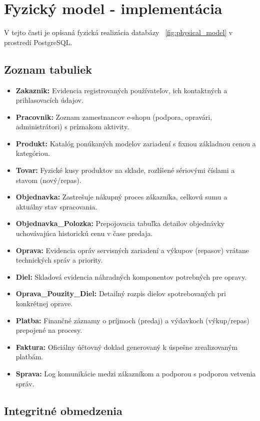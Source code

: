 \documentclass[11pt, a4paper]{article}
\begin{document}
\clearpage

\section{Fyzický model - implementácia}
\label{sec:model}
V tejto časti je opísaná fyzická realizácia databázy ~\ref{fig:physical_model} v prostredí PostgreSQL.

\subsection{Zoznam tabuliek}

\begin{itemize}
    \item \textbf{Zakaznik:} Evidencia registrovaných používateľov, ich kontaktných a prihlasovacích údajov.
    \item \textbf{Pracovnik:} Zoznam zamestnancov e-shopu (podpora, opravári, administrátori) s príznakom aktivity.
    \item \textbf{Produkt:} Katalóg ponúkaných modelov zariadení s fixnou základnou cenou a kategóriou.
    \item \textbf{Tovar:} Fyzické kusy produktov na sklade, rozlíšené sériovými číslami a stavom (nový/repas).
    \item \textbf{Objednavka:} Zastrešuje nákupný proces zákazníka, celkovú sumu a aktuálny stav spracovania.
    \item \textbf{Objednavka\_Polozka:} Prepojovacia tabuľka detailov objednávky uchovávajúca historickú cenu v čase predaja.
    \item \textbf{Oprava:} Evidencia opráv servisných zariadení a výkupov (repasov) vrátane technických správ a priority.
    \item \textbf{Diel:} Skladová evidencia náhradných komponentov potrebných pre opravy.
    \item \textbf{Oprava\_Pouzity\_Diel:} Detailný rozpis dielov spotrebovaných pri konkrétnej oprave.
    \item \textbf{Platba:} Finančné záznamy o príjmoch (predaj) a výdavkoch (výkup/repas) prepojené na procesy.
    \item \textbf{Faktura:} Oficiálny účtovný doklad generovaný k úspešne zrealizovaným platbám.
    \item \textbf{Sprava:} Log komunikácie medzi zákazníkom a podporou s podporou vetvenia správ.
\end{itemize}

\subsection{Integritné obmedzenia}
\end{document}
